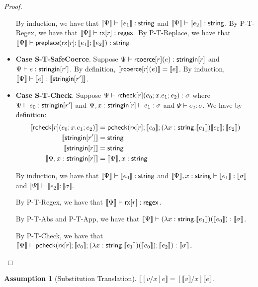 \documentclass[11pt,leqno]{article}
\newtheorem{ass}[tr]{Assumption}
\theoremstyle{definition}
\newcommand{\rcoerce}[2]{{\sf rcoerce}[#1](#2)}
\newcommand{\rcheck}[4]{ {\sf rcheck}[#1](#2;#3;#4) }
\newcommand{\stringin}[1]{{\sf stringin}[#1]}
\newcommand{\tcheck}[4]{{\sf pcheck}(#1; #2; #3; #4)}
\newcommand{\preplace}[3]{{\sf preplace}(#1;#2;#3)}
\newcommand{\rx}[1]{ {\sf rx}[#1] }
\newcommand{\str}{{\sf string}}
\newcommand{\regex}{{\sf regex}}
\newcommand{\sctx}{\Psi} %
\newcommand{\trden}[1]{\llbracket #1 \rrbracket} %
\begin{document}
\begin{proof}
\begin{itemize}[label=$ $,itemsep=1ex]
By induction, we have that $\trden{\sctx} \vdash \trden{e_1} : \str$ and $\trden{\sctx} \vdash \trden{e_2} : \str$. By P-T-Regex, we have that $\trden{\sctx} \vdash \rx{r} : \regex$. By P-T-Replace, we have that $\trden{\sctx} \vdash \preplace{\rx{r}}{\trden{e_1}}{\trden{e_2}} : \str$.

\item \textbf{Case S-T-SafeCoerce}.
Suppose $\sctx \vdash \rcoerce{r}{e} : \stringin{r}$ and $\sctx \vdash e : \stringin{r'}$. By definition, $\trden{ \rcoerce{r}{e} } = \trden{e}$.
By induction, $\trden{\sctx} \vdash \trden{e} : \trden{\stringin{r'}}$.

\item \textbf{Case S-T-Check}.
Suppose $\sctx \vdash \rcheck{r}{e_0}{x.e_1}{e_2} : \sigma$ where
$\sctx \vdash e_0 : \stringin{r'}$ and 
$\sctx, x : \stringin{r} \vdash e_1 : \sigma$ and
$\sctx \vdash e_2 : \sigma$. We have by definition:
\begin{align*}
\trden{\rcheck{r}{e_0}{x.e_1}{e_2}} &= \tcheck{\rx{r}}{\trden{e_0}}{(\lambda x : \str.\trden{e_1}) \trden{e_0}}{\trden{e_2}}\\
\trden{\stringin{r'}} &= \str\\
\trden{\stringin{r}} &= \str\\
\trden{\sctx, x : \stringin{r}} &= \trden{\sctx}, x : \str
\end{align*}

By induction, we have that $\trden{\sctx} \vdash \trden{e_0} : \str$ and $\trden{\sctx}, x : \str \vdash \trden{e_1} : \trden{\sigma}$ and $\trden{\sctx} \vdash \trden{e_2} : \trden{\sigma}$.

By P-T-Regex, we have that $\trden{\sctx} \vdash \rx{r} : \regex$.

By P-T-Abs and P-T-App, we have that $\trden{\sctx} \vdash (\lambda x : \str.\trden{e_1})(\trden{e_0}) : \trden{\sigma}$.

By P-T-Check, we have that $\trden{\sctx} \vdash \tcheck{\rx{r}}{\trden{e_0}}{(\lambda x : \str.\trden{e_1})(\trden{e_0})}{\trden{e_2}} : \trden{\sigma}$.

\end{itemize}
\end{proof}

\begin{ass}[Substitution Translation]\label{ass:subs-trans} 
$\trden{[v/x]e}=[\trden{v}/x]\trden{e}$.
\end{ass}
\end{document}
